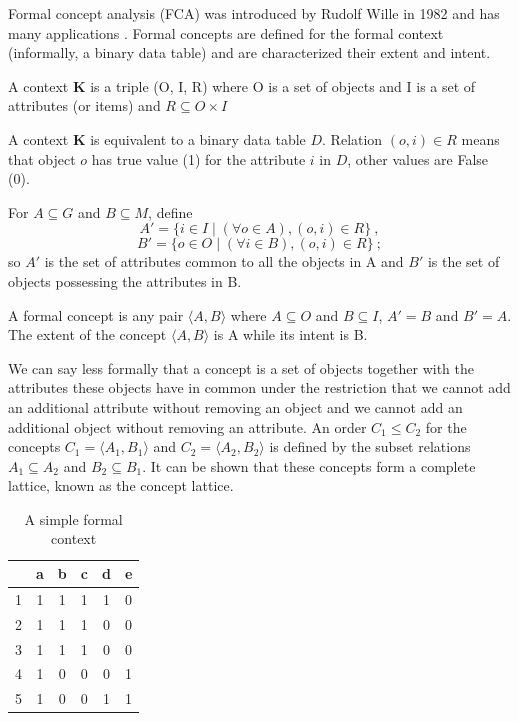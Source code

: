 \documentclass[acmconf,authordraft]{acmart}
\begin{document}
 Formal concept analysis (FCA) was introduced by Rudolf Wille in 1982 \cite{wille_restructuring_2009} and has many applications \cite{ganter_formal_2005}. Formal concepts are defined for the formal context (informally, a binary data table) and are characterized their extent and intent.


\begin{definition} 
A context \textbf{K} is a triple (O, I, R) where O is a set of objects and I is a set of attributes (or items) and $ {R \subseteq O \times I} $
\end{definition}

A context \textbf{K} is equivalent to a binary data table $D$. Relation $(o, i) \in R$ means that object $o$ has true value (1) for the attribute $i$ in $D$, other values are False (0). 

\begin{definition} 
For $ A \subseteq G $ and $ B \subseteq M $, define 
\begin{equation}
A'=\bigl\{i \in I \mid (\forall o \in A), (o, i) \in R \bigr\} \ ,
\end{equation}
\begin{equation}
B'=\bigl\{o \in O \mid (\forall i \in B), (o, i) \in R \bigr\} \ ;
\end{equation}
so $A'$ is the set of attributes common to all the objects in A and $B'$ is the set of objects possessing the attributes in B.
\label{def:prim}
\end{definition}

\begin{definition}
A formal concept is any pair $\langle A, B \rangle$ where $A \subseteq O $ and $ B \subseteq I $, $A' = B$ and $B' = A$.
The extent of the concept $\langle A, B \rangle$ is A while its intent is B.
\end{definition}

We can say less formally that a concept is a set of objects together with the  attributes these objects have in common under the restriction that we cannot add an additional attribute without removing an object and we cannot add an additional object without removing an attribute. 
An order $C_1 \leq C_2$  for the concepts $C_1 = \langle A_1, B_1 \rangle$ and $C_2 = \langle A_2, B_2 \rangle$ is defined by the subset relations $A_1 \subseteq A_2$ and $B_2 \subseteq B_1$. It can be shown \cite{davey_introduction_2002} that these concepts form a complete lattice, known as the concept lattice. 

\begin{table}
  \caption{A simple  formal context}
  \label{tab:simplecontext}
  \begin{tabular}{lccccc}
    \toprule
    & a & b & c & d & e\\
    \midrule
    1 & 1 & 1 & 1 & 1 & 0\\
    2 & 1 & 1 & 1 & 0 & 0\\
    3 & 1 & 1 & 1 & 0 & 0\\
    4 & 1 & 0 & 0 & 0 & 1\\
    5 & 1 & 0 & 0 & 1 & 1\\
  \bottomrule
\end{tabular}
\end{table}
\end{document}

